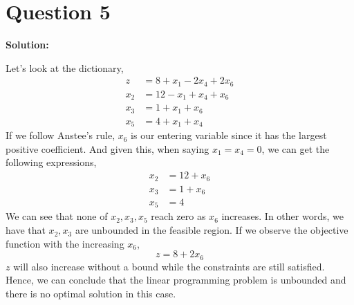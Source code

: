 \documentclass[11pt]{article}
\newenvironment{solution}
  {\par\noindent\textbf{Solution:}\par}
  {\par}
\begin{document}
\section*{Question 5}
\begin{solution}
 Let's look at the dictionary,
\[
  \begin{aligned}
    z &= 8+x_1-2x_4+2x_6 \\ 
    x_2 &= 12-x_1 + x_4 + x_6 \\ 
    x_3 &= 1+x_1 + x_6 \\ 
    x_5 &= 4 + x_1 +x_4
  \end{aligned}
\]
If we follow Anstee's rule, $x_6$ is our entering variable since it has the largest positive coefficient. And given this, when saying $x_1=x_4 =0$, we can get the following expressions,
\[
  \begin{aligned}
    x_2 &= 12+x_6 \\ 
    x_3 &= 1+x_6 \\ 
    x_5 &= 4 
  \end{aligned}
\]
We can see that none of $x_2,x_3,x_5$ reach zero as $x_6$ increases. In other words, we have that $x_2,x_3$ are unbounded in the feasible region. 
If we observe the objective function with the increasing $x_6$,
\[ z = 8+2x_6 \]
$z$ will also increase without a bound while the constraints are still satisfied. Hence, we can conclude that the linear programming problem is unbounded and there is no optimal solution in this case.
\end{solution}
\end{document}

